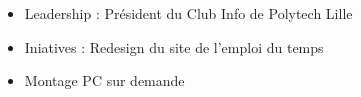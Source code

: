 %
%
%

\twocolumnsection
{
\begin{skills}
\end{skills}}
{
\vspace{1em}
\begin{itemize}
	\item Leadership : Président du Club Info de Polytech Lille
	\item Iniatives : Redesign du site de l'emploi du temps                  
    \item Montage PC sur demande
\end{itemize}
}
